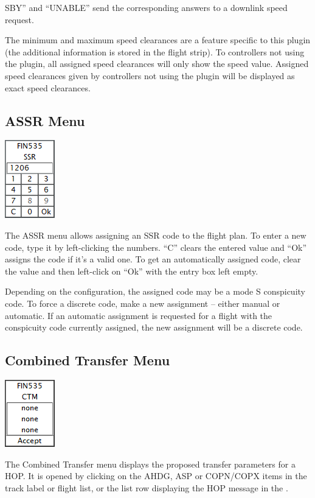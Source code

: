\documentclass[11pt,a4paper,oldfontcommands]{memoir}
\newenvironment{Warn}
  {\begin{shaded}\marginnote{\fbox{Warning}}}
  {\end{shaded}}
\begin{document}
SBY” and “UNABLE” send the corresponding answers to a downlink speed request.

\begin{Warn}
The minimum and maximum speed clearances are a feature specific to this plugin (the additional information is stored in the flight strip). To controllers not using the plugin, all assigned speed clearances will only show the speed value. Assigned speed clearances given by controllers not using the plugin will be displayed as exact speed clearances.
\end{Warn}

\subsection{ASSR Menu}
\label{menu:assr}
\includegraphics{img/assr.png}

The ASSR menu allows assigning an SSR code to the flight plan. To enter a new code, type it by left-clicking the numbers. “C” clears the entered value and “Ok” assigns the code if it’s a valid one. To get an automatically assigned code, clear the value and then left-click on “Ok” with the entry box left empty.

Depending on the configuration, the assigned code may be a mode S conspicuity code. To force a discrete code, make a new assignment – either manual or automatic. If an automatic assignment is requested for a flight with the conspicuity code currently assigned, the new assignment will be a discrete code.

\subsection{Combined Transfer Menu}
\label{menu:ctm}
\includegraphics{img/ctm.png}

The Combined Transfer menu displays the proposed transfer parameters for a HOP. It is opened by clicking on the AHDG, ASP or COPN/COPX items in the track label or flight list, or the list row displaying the HOP message in the \textit{}.
\end{document}
